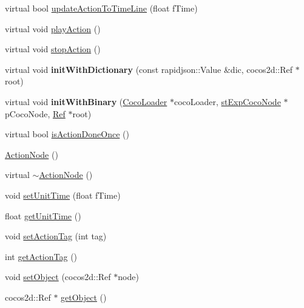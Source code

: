 \begin{DoxyCompactItemize}
\item 
virtual bool \hyperlink{classcocostudio_1_1ActionNode_a6dd43861b2ceeb74b0c85ddb10621a8f}{update\+Action\+To\+Time\+Line} (float f\+Time)
\item 
virtual void \hyperlink{classcocostudio_1_1ActionNode_ad5f59a7173fe2672eaa54c06397ad2f0}{play\+Action} ()
\item 
virtual void \hyperlink{classcocostudio_1_1ActionNode_a5a9d49d7fb690ba070be2cd6316930b1}{stop\+Action} ()
\item 
\mbox{\label{classcocostudio_1_1ActionNode_a2422acf6874a216e9767495647d2e295}} 
virtual void {\bfseries init\+With\+Dictionary} (const rapidjson\+::\+Value \&dic, cocos2d\+::\+Ref $\ast$root)
\item 
\mbox{\label{classcocostudio_1_1ActionNode_aced99c5885ecbf38bf81f993d1496336}} 
virtual void {\bfseries init\+With\+Binary} (\hyperlink{classcocostudio_1_1CocoLoader}{Coco\+Loader} $\ast$coco\+Loader, \hyperlink{structcocostudio_1_1stExpCocoNode}{st\+Exp\+Coco\+Node} $\ast$p\+Coco\+Node, \hyperlink{classRef}{Ref} $\ast$root)
\item 
virtual bool \hyperlink{classcocostudio_1_1ActionNode_afbb69bec168ed021dd7e85894cb6f8df}{is\+Action\+Done\+Once} ()
\item 
\hyperlink{classcocostudio_1_1ActionNode_ab5f8fd09d1d0942161155f6dc4007b3a}{Action\+Node} ()
\item 
virtual \hyperlink{classcocostudio_1_1ActionNode_a2828e1138b60a9dbb3a744f9808c41e9}{$\sim$\+Action\+Node} ()
\item 
void \hyperlink{classcocostudio_1_1ActionNode_acd7aacf5c0b22f3d9eee8a7504c8b852}{set\+Unit\+Time} (float f\+Time)
\item 
float \hyperlink{classcocostudio_1_1ActionNode_a26e826ff6e9e705b81fe59a25a938367}{get\+Unit\+Time} ()
\item 
void \hyperlink{classcocostudio_1_1ActionNode_abf63180dfd8e03e98dbfb679f55edfcf}{set\+Action\+Tag} (int tag)
\item 
int \hyperlink{classcocostudio_1_1ActionNode_aa444087ebd76949143dcb9adad98dc93}{get\+Action\+Tag} ()
\item 
void \hyperlink{classcocostudio_1_1ActionNode_a77ead6b033989a2e51daf494baa6df86}{set\+Object} (cocos2d\+::\+Ref $\ast$node)
\item 
cocos2d\+::\+Ref $\ast$ \hyperlink{classcocostudio_1_1ActionNode_a5798b463abed6f9b01258a8a5e215fc9}{get\+Object} ()

\end{DoxyCompactItemize}
